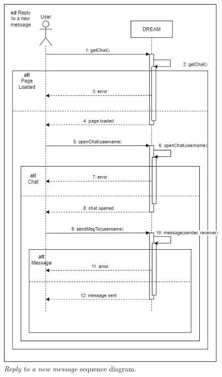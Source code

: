 \begin{figure}[H]
    \centering
    \includegraphics[origin=c,height=1.5\textwidth]{Images/Use Case/UC3.png}
    \caption{\textit{Reply to a new message} sequence diagram.}
\end{figure}
\newpage

